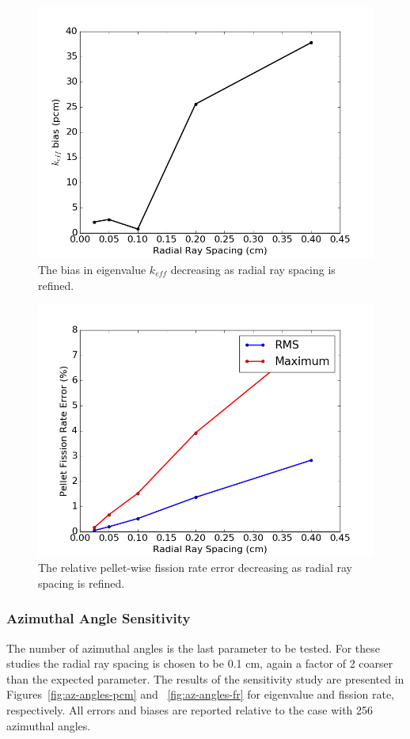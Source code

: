 \begin{figure}[h!]
	\centering
	\includegraphics[width=0.7\linewidth]{figures/results/sensitivity/rad_spacing_pcm.png}
	\caption[]{The bias in eigenvalue $k_{\textit{eff}}$ decreasing as radial ray spacing is refined.}
	\label{fig:radial-rs-pcm}
\end{figure}
\begin{figure}[h!]
	\centering
	\includegraphics[width=0.7\linewidth]{figures/results/sensitivity/rad_spacing_fr.png}
	\caption[]{The relative pellet-wise fission rate error decreasing as radial ray spacing is refined.}
	\label{fig:radial-rs-fr}
\end{figure}

\newpage
\subsubsection{Azimuthal Angle Sensitivity}

The number of azimuthal angles is the last parameter to be tested. For these studies the radial ray spacing is chosen to be 0.1 cm, again a factor of 2 coarser than the expected parameter. The results of the sensitivity study are presented in Figures~\ref{fig:az-angles-pcm} and ~\ref{fig:az-angles-fr} for eigenvalue and fission rate, respectively. All errors and biases are reported relative to the case with 256 azimuthal angles.

